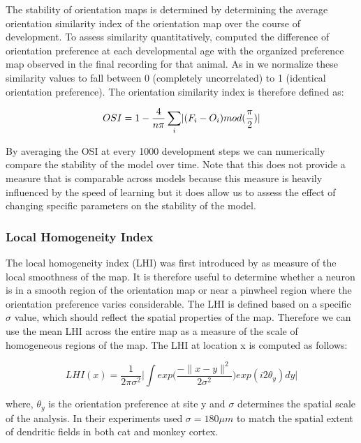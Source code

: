 The stability of orientation maps is determined by determining the
average orientation similarity index of the orientation map over the
course of development. To assess similarity quantitatively,
\cite{Chapman1996} computed the difference of orientation preference
at each developmental age with the organized preference map observed
in the final recording for that animal. As in \cite{Stevens2013} we
normalize these similarity values to fall between 0 (completely
uncorrelated) to 1 (identical orientation preference). The orientation
similarity index is therefore defined as:

\begin{equation}
  OSI = 1 - \frac{4}{n\pi} \sum_{i}\lvert(F_{i}-O_{i})mod(\frac{\pi}{2})\rvert
\end{equation}

By averaging the OSI at every 1000 development steps we can
numerically compare the stability of the model over time. Note that
this does not provide a measure that is comparable across models
because this measure is heavily influenced by the speed of learning
but it does allow us to assess the effect of changing specific
parameters on the stability of the model.

\subsubsection{Local Homogeneity Index}

The local homogeneity index (LHI) was first introduced by
\cite{Nauhaus2008} as measure of the local smoothness of the map. It
is therefore useful to determine whether a neuron is in a smooth
region of the orientation map or near a pinwheel region where the
orientation preference varies considerable. The LHI is defined based
on a specific $\sigma$ value, which should reflect the spatial
properties of the map. Therefore we can use the mean LHI across the
entire map as a measure of the scale of homogeneous regions of the
map. The LHI at location x is computed as follows:

\begin{equation}
  LHI(x) = \frac{1}{2\pi \sigma^2} \bigg\lvert \int
  exp\bigg(\frac{-\|x-y\|^2}{2\sigma^2}\bigg) exp(i2\theta_y) dy
  \bigg\rvert
\end{equation}

where, $\theta_y$ is the orientation preference at site y and $\sigma$
determines the spatial scale of the analysis. In their experiments
\cite{Nauhaus2008} used $\sigma=180\mu m$ to match the spatial extent
of dendritic fields in both cat and monkey cortex.

